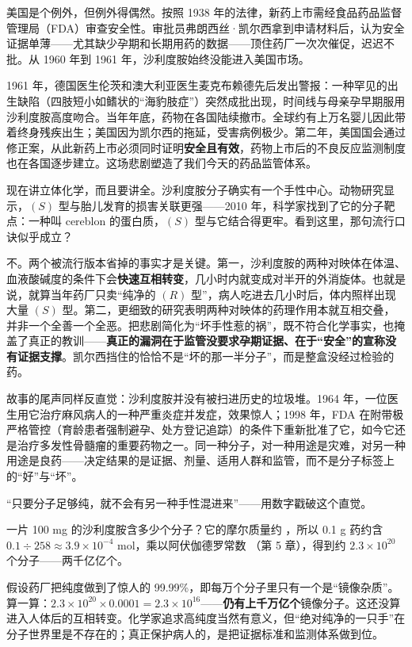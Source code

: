 美国是个例外，但例外得偶然。按照 1938 年的法律，新药上市需经食品药品监督管理局（FDA）审查安全性。审批员弗朗西丝·凯尔西拿到申请材料后，认为安全证据单薄——尤其缺少孕期和长期用药的数据——顶住药厂一次次催促，迟迟不批。从 1960 年到 1961 年，沙利度胺始终没能进入美国市场。

1961 年，德国医生伦茨和澳大利亚医生麦克布赖德先后发出警报：一种罕见的出生缺陷（四肢短小如鳍状的“海豹肢症”）突然成批出现，时间线与母亲孕早期服用沙利度胺高度吻合。当年年底，药物在各国陆续撤市。全球约有上万名婴儿因此带着终身残疾出生；美国因为凯尔西的拖延，受害病例极少。第二年，美国国会通过修正案，从此新药上市必须同时证明\textbf{安全且有效}，药物上市后的不良反应监测制度也在各国逐步建立。这场悲剧塑造了我们今天的药品监管体系。

现在讲立体化学，而且要讲全。沙利度胺分子确实有一个手性中心。动物研究显示，$(S)$ 型与胎儿发育的损害关联更强——2010 年，科学家找到了它的分子靶点：一种叫 cereblon 的蛋白质，$(S)$ 型与它结合得更牢。看到这里，那句流行口诀似乎成立？

不。两个被流行版本省掉的事实才是关键。第一，沙利度胺的两种对映体在体温、血液酸碱度的条件下会\textbf{快速互相转变}，几小时内就变成对半开的外消旋体。也就是说，就算当年药厂只卖“纯净的 $(R)$ 型”，病人吃进去几小时后，体内照样出现大量 $(S)$ 型。第二，更细致的研究表明两种对映体的药理作用本就互相交叠，并非一个全善一个全恶。把悲剧简化为“坏手性惹的祸”，既不符合化学事实，也掩盖了真正的教训——\textbf{真正的漏洞在于监管没要求孕期证据、在于“安全”的宣称没有证据支撑}。凯尔西挡住的恰恰不是“坏的那一半分子”，而是整盒没经过检验的药。

故事的尾声同样反直觉：沙利度胺并没有被扫进历史的垃圾堆。1964 年，一位医生用它治疗麻风病人的一种严重炎症并发症，效果惊人；1998 年，FDA 在附带极严格管控（育龄患者强制避孕、处方登记追踪）的条件下重新批准了它，如今它还是治疗多发性骨髓瘤的重要药物之一。同一种分子，对一种用途是灾难，对另一种用途是良药——决定结果的是证据、剂量、适用人群和监管，而不是分子标签上的“好”与“坏”。

\begin{qiaoliang}
“只要分子足够纯，就不会有另一种手性混进来”——用数字戳破这个直觉。

一片 100 mg 的沙利度胺含多少个分子？它的摩尔质量约 ，所以 0.1 g 药约含 $0.1\div258\approx3.9\times10^{-4}$ mol，乘以阿伏伽德罗常数 （第 5 章），得到约 $2.3\times10^{20}$ 个分子——两千亿亿个。

假设药厂把纯度做到了惊人的 99.99\%，即每万个分子里只有一个是“镜像杂质”。算一算：$2.3\times10^{20}\times0.0001=2.3\times10^{16}$——\textbf{仍有上千万亿个}镜像分子。这还没算进入人体后的互相转变。化学家追求高纯度当然有意义，但“绝对纯净的一只手”在分子世界里是不存在的；真正保护病人的，是把证据标准和监测体系做到位。
\end{qiaoliang}

